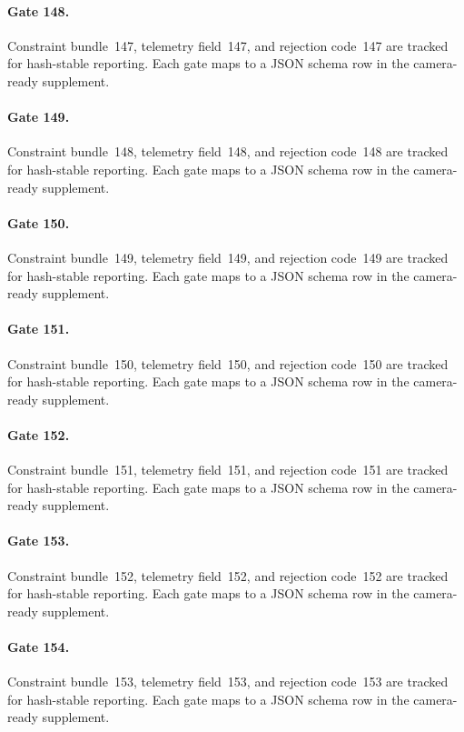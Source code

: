 \documentclass[sigconf,nonacm]{acmart}
\begin{document}
\paragraph{Gate 148.}
Constraint bundle~147, telemetry field~147, and rejection code~147 are tracked for hash-stable reporting. Each gate maps to a JSON schema row in the camera-ready supplement. %

\paragraph{Gate 149.}
Constraint bundle~148, telemetry field~148, and rejection code~148 are tracked for hash-stable reporting. Each gate maps to a JSON schema row in the camera-ready supplement. %

\paragraph{Gate 150.}
Constraint bundle~149, telemetry field~149, and rejection code~149 are tracked for hash-stable reporting. Each gate maps to a JSON schema row in the camera-ready supplement. %

\paragraph{Gate 151.}
Constraint bundle~150, telemetry field~150, and rejection code~150 are tracked for hash-stable reporting. Each gate maps to a JSON schema row in the camera-ready supplement. %

\paragraph{Gate 152.}
Constraint bundle~151, telemetry field~151, and rejection code~151 are tracked for hash-stable reporting. Each gate maps to a JSON schema row in the camera-ready supplement. %

\paragraph{Gate 153.}
Constraint bundle~152, telemetry field~152, and rejection code~152 are tracked for hash-stable reporting. Each gate maps to a JSON schema row in the camera-ready supplement. %

\paragraph{Gate 154.}
Constraint bundle~153, telemetry field~153, and rejection code~153 are tracked for hash-stable reporting. Each gate maps to a JSON schema row in the camera-ready supplement. %
\end{document}
